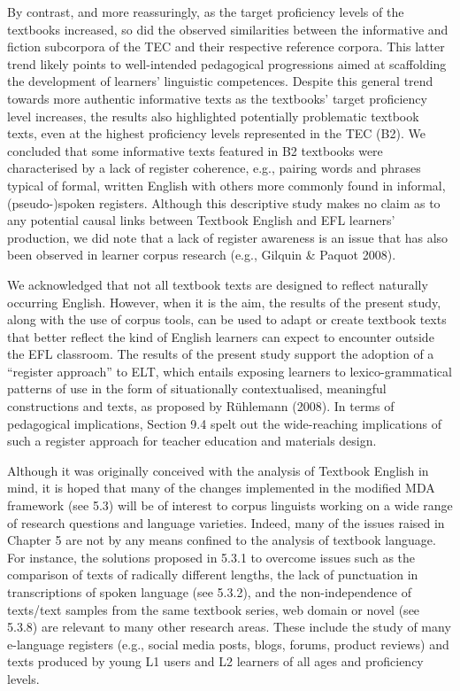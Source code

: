 \documentclass[
  letterpaper,
  DIV=11,
  numbers=noendperiod]{scrreprt}
\begin{document}
By contrast, and more reassuringly, as the target proficiency levels of
the textbooks increased, so did the observed similarities between the
informative and fiction subcorpora of the TEC and their respective
reference corpora. This latter trend likely points to well-intended
pedagogical progressions aimed at scaffolding the development of
learners' linguistic competences. Despite this general trend towards
more authentic informative texts as the textbooks' target proficiency
level increases, the results also highlighted potentially problematic
textbook texts, even at the highest proficiency levels represented in
the TEC (B2). We concluded that some informative texts featured in B2
textbooks were characterised by a lack of register coherence, e.g.,
pairing words and phrases typical of formal, written English with others
more commonly found in informal, (pseudo-)spoken registers. Although
this descriptive study makes no claim as to any potential causal links
between Textbook English and EFL learners' production, we did note that
a lack of register awareness is an issue that has also been observed in
learner corpus research (e.g., Gilquin \& Paquot 2008).

We acknowledged that not all textbook texts are designed to reflect
naturally occurring English. However, when it is the aim, the results of
the present study, along with the use of corpus tools, can be used to
adapt or create textbook texts that better reflect the kind of English
learners can expect to encounter outside the EFL classroom. The results
of the present study support the adoption of a ``register approach'' to
ELT, which entails exposing learners to lexico-grammatical patterns of
use in the form of situationally contextualised, meaningful
constructions and texts, as proposed by Rühlemann (2008). In terms of
pedagogical implications, Section 9.4 spelt out the wide-reaching
implications of such a register approach for teacher education and
materials design.

Although it was originally conceived with the analysis of Textbook
English in mind, it is hoped that many of the changes implemented in the
modified MDA framework (see 5.3) will be of interest to corpus linguists
working on a wide range of research questions and language varieties.
Indeed, many of the issues raised in Chapter 5 are not by any means
confined to the analysis of textbook language. For instance, the
solutions proposed in 5.3.1 to overcome issues such as the comparison of
texts of radically different lengths, the lack of punctuation in
transcriptions of spoken language (see 5.3.2), and the non-independence
of texts/text samples from the same textbook series, web domain or novel
(see 5.3.8) are relevant to many other research areas. These include the
study of many e-language registers (e.g., social media posts, blogs,
forums, product reviews) and texts produced by young L1 users and L2
learners of all ages and proficiency levels.
\end{document}
